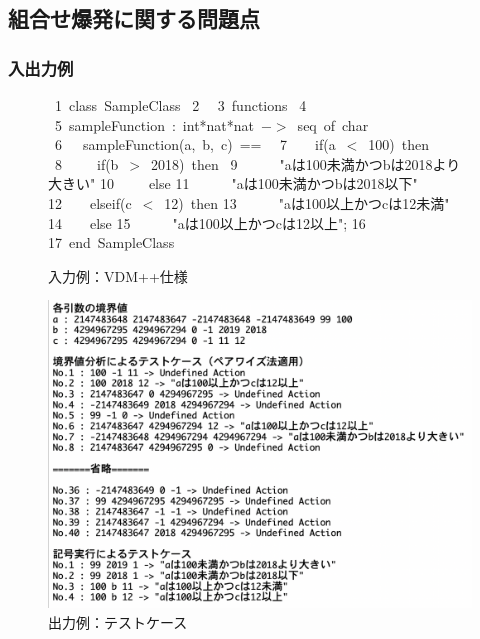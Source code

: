 \documentclass[uplatex, report, a4j, 10pt]{jsbook}
\begin{document}
\subsection{組合せ爆発に関する問題点}
\subsubsection{入出力例}
\begin{figure}[tb]
	\vbox{
		\hbox{ 1 class SampleClass}
		\hbox{ 2 }
		\hbox{ 3 functions}
		\hbox{ 4 }
		\hbox{ 5 sampleFunction : int*nat*nat $->$ seq of char}
		\hbox{ 6 \ \ sampleFunction(a, b, c) == }
		\hbox{ 7 \ \ \ if(a $<$ 100) then}
		\hbox{ 8 \ \ \ \ if(b $>$ 2018) then}
		\hbox{ 9 \ \ \ \ \ "aは100未満かつbは2018より大きい"}
		\hbox{10 \ \ \ \ else}
		\hbox{11 \ \ \ \ \ "aは100未満かつbは2018以下"}
		\hbox{12 \ \ \ elseif(c $<$ 12) then}
		\hbox{13 \ \ \ \ \ "aは100以上かつcは12未満"}
		\hbox{14 \ \ \ else}
		\hbox{15 \ \ \ \ \ "aは100以上かつcは12以上";}
		\hbox{16 }
		\hbox{17 end SampleClass}
	}
	\centerline{}
	\caption{入力例：VDM++仕様}
	\label{fig:input_sample}
\end{figure}

\begin{figure}[t]
	\begin{center}
		\includegraphics[keepaspectratio, width=160mm]{figs/sample_testcase.png}
		\caption{出力例：テストケース}
		\label{fig:testcase_sample}
	\end{center}
\end{figure}
\end{document}

